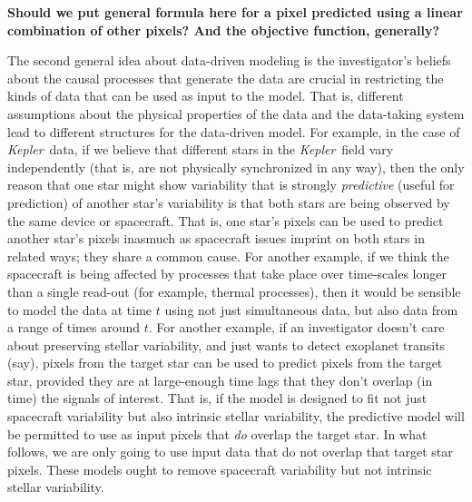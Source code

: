 \documentclass[12pt, preprint]{aastex}
\newcommand{\project}[1]{\textsl{#1}}
\newcommand{\Kepler}{\project{Kepler}}
\newcommand{\todo}[1]{\textbf{#1}}
\begin{document}
\todo{Should we put general formula here for a pixel predicted using a linear combination of other pixels?
  And the objective function, generally?}

The second general idea about data-driven modeling is the investigator's beliefs
  about the causal processes that generate the data
  are crucial in restricting the kinds of data that can be used as input to the model.
That is, different assumptions about the physical properties of the data
  and the data-taking system
  lead to different structures for the data-driven model.
For example, in the case of \Kepler\ data,
  if we believe that different stars in the \Kepler\ field vary independently
  (that is, are not physically synchronized in any way),
  then the only reason that one star might show variability that is strongly \emph{predictive}
  (useful for prediction) of another star's variability
  is that both stars are being observed by the same device or spacecraft.
That is, one star's pixels can be used to predict another star's pixels
  inasmuch as spacecraft issues imprint on both stars in related ways;
  they share a common cause.
For another example, if we think the spacecraft is being affected by
  processes that take place over time-scales longer than a single read-out
  (for example, thermal processes),
  then it would be sensible to model the data at time $t$ using not just simultaneous data,
  but also data from a range of times around $t$.
For another example, if an investigator doesn't care about preserving stellar variability,
  and just wants to detect exoplanet transits (say),
  pixels from the target star can be used to predict pixels from the target star,
  provided they are at large-enough time lags that they don't overlap (in time)
  the signals of interest.
That is, if the model is designed to fit not just spacecraft variability
  but also intrinsic stellar variability,
  the predictive model will be permitted to use as input pixels that \emph{do} overlap the target star.
In what follows, we are only going to use input data that do not overlap that target star pixels.
These models ought to remove spacecraft variability but not intrinsic stellar variability.
\end{document}
